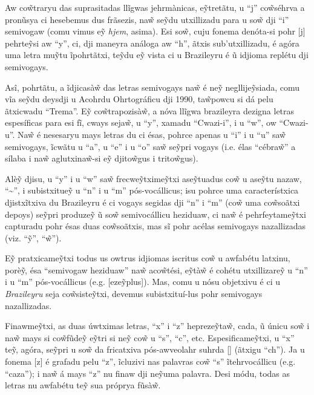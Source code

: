 \documentclass[12pt, a5paper, titlepage]{article}
\begin{document}
\begin{bilingualpages}
    Aw co\~wtraryu das suprasitadas llĩgwas jehrmànicas, e\~ytretãtu, u ``j''
    co\~wséhrva a pronũsya ci hesebemus dus frãsezis, na\~w se\~ydu utxillizadu
    para u so\~w dji ``i'' semivogaw (comu vimus e\~y \textit{hjem}, asima). Esi
    so\~w, cuju fonema denóta-si pohr [j] pehrte\~ysi aw ``y'', ci, dji maneyra
    análoga aw ``h'', ãtxis sub'utxillizadu, é agóra uma letra mu\~ytu ĩpohrtãtxi,
    te\~ydu e\~y vista ci u Brazileyru é ũ idjioma replétu dji semivogays.

    Asî, pohrtãtu, a ĩdjicasà\~w das letras semivogays na\~w é ne\~y
    negllije\~ysiada, comu vĩa se\~ydu deysdji u Acohrdu Ohrtográficu dji 1990,
    ta\~wpowcu si dá pelu ãtxicwadu ``Trema''. E\~y co\~wtrapozisà\~w, a nóva
    llĩgwa brazileyra dezigna letras espesíficas para esi fĩ, cways seja\~w, u
    ``y'', xamadu ``Cwazi-i'', i u ``w'', ow ``Cwazi-u''. Na\~w é nesesaryu mays
    letras du ci ésas, pohrce apenas u ``i'' i u ``u'' sa\~w semivogays, ĩcwãtu u
    ``a'', u ``e'' i u ``o'' sa\~w se\~ypri vogays (i.e. élas ``cébra\~w'' a sílaba
    i na\~w aglutxina\~w-si e\~y djito\~wgus i trito\~wgus).

    Alè\~y djisu, u ``y'' i u ``w'' sa\~w frecwe\~ytxime\~ytxi ase\~ytuadus co\~w u
    ase\~ytu nazaw, ``\textasciitilde'', i subistxitue\~y u ``n'' i u ``m''
    pós-vocállicus; isu pohrce uma característxica djistxĩtxiva du Brazileyru é ci
    vogays segidas dji ``n'' i ``m'' (co\~w uma co\~wsoãtxi depoys) se\~ypri
    produze\~y ũ so\~w semivocállicu heziduaw, ci na\~w é pehrfeytame\~ytxi
    capturadu pohr ésas duas co\~wsoãtxis, mas sĩ pohr acélas semivogays
    nazallizadas (viz. ``\~y'', ``\~w'').

    E\~y pratxicame\~ytxi todus us owtrus idjiomas iscritus co\~w u awfabétu
    latxinu, porè\~y, ésa ``semivogaw heziduaw'' na\~w aco\~wtési, e\~ytà\~w é
    cohétu utxillizare\~y u ``n'' i u ``m'' pós-vocállicus (e.g. [eze\~yplus]).
    Mas, comu u nósu objetxivu é ci u \textit{Brazileyru} seja co\~wsiste\~ytxi,
    devemus subistxituí-lus pohr semivogays nazallizadas.

    Finawme\~ytxi, as duas úwtximas letras, ``x'' i ``z'' hepreze\~yta\~w, cada, ũ
    únicu so\~w i na\~w mays si co\~wfũde\~y e\~ytri si ne\~y co\~w u ``s'', ``c'',
    etc. Espesificame\~ytxi, u ``x'' te\~y, agóra, se\~ypri u so\~w da fricatxiva
    pós-awveolahr suhrda [\textesh] (ãtxigu ``ch''). Ja u fonema [z] é grafadu pelu
    ``z'', ĩcluzivi nas palavras co\~w ``s'' ĩtehrvocállicu (e.g. ``caza''); i
    na\~w á mays ``z'' nu finaw dji ne\~yuma palavra. Desi módu, todas as letras nu
    awfabétu te\~y sua próprya fũsà\~w.


\end{bilingualpages}
\end{document}
